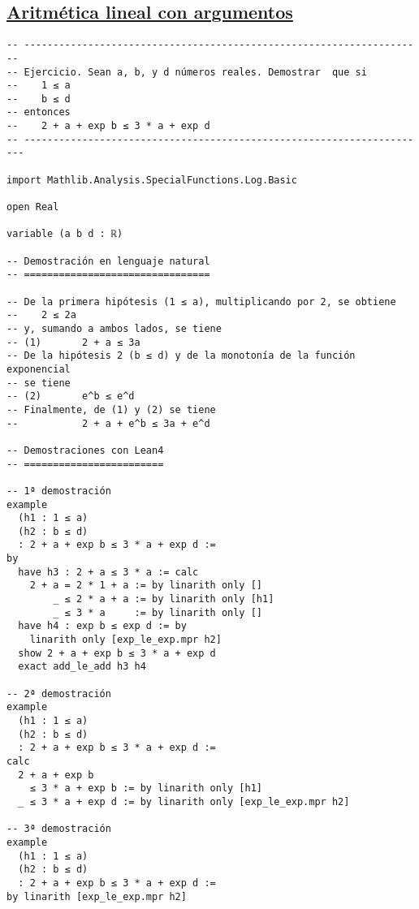 \subsection{\href{./src/Basicos/Aritmetica\_lineal\_con\_argumentos.lean}{Aritmética lineal con argumentos}}
\label{sec:org3e64a85}
\begin{verbatim}
-- ---------------------------------------------------------------------
-- Ejercicio. Sean a, b, y d números reales. Demostrar  que si
--    1 ≤ a
--    b ≤ d
-- entonces
--    2 + a + exp b ≤ 3 * a + exp d
-- ----------------------------------------------------------------------

import Mathlib.Analysis.SpecialFunctions.Log.Basic

open Real

variable (a b d : ℝ)

-- Demostración en lenguaje natural
-- ================================

-- De la primera hipótesis (1 ≤ a), multiplicando por 2, se obtiene
--    2 ≤ 2a
-- y, sumando a ambos lados, se tiene
-- (1)       2 + a ≤ 3a
-- De la hipótesis 2 (b ≤ d) y de la monotonía de la función exponencial
-- se tiene
-- (2)       e^b ≤ e^d
-- Finalmente, de (1) y (2) se tiene
--           2 + a + e^b ≤ 3a + e^d

-- Demostraciones con Lean4
-- ========================

-- 1ª demostración
example
  (h1 : 1 ≤ a)
  (h2 : b ≤ d)
  : 2 + a + exp b ≤ 3 * a + exp d :=
by
  have h3 : 2 + a ≤ 3 * a := calc
    2 + a = 2 * 1 + a := by linarith only []
        _ ≤ 2 * a + a := by linarith only [h1]
        _ ≤ 3 * a     := by linarith only []
  have h4 : exp b ≤ exp d := by
    linarith only [exp_le_exp.mpr h2]
  show 2 + a + exp b ≤ 3 * a + exp d
  exact add_le_add h3 h4

-- 2ª demostración
example
  (h1 : 1 ≤ a)
  (h2 : b ≤ d)
  : 2 + a + exp b ≤ 3 * a + exp d :=
calc
  2 + a + exp b
    ≤ 3 * a + exp b := by linarith only [h1]
  _ ≤ 3 * a + exp d := by linarith only [exp_le_exp.mpr h2]

-- 3ª demostración
example
  (h1 : 1 ≤ a)
  (h2 : b ≤ d)
  : 2 + a + exp b ≤ 3 * a + exp d :=
by linarith [exp_le_exp.mpr h2]
\end{verbatim}

